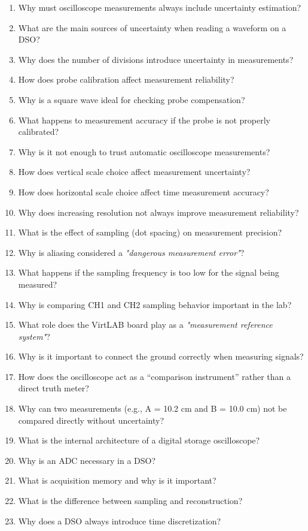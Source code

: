 \documentclass[../main.tex]{subfiles}
\begin{document}
\begin{enumerate}[label=\textbf{\arabic*.}]
	\item Why must oscilloscope measurements always include uncertainty estimation?
	\item What are the main sources of uncertainty when reading a waveform on a DSO?
	\item Why does the number of divisions introduce uncertainty in measurements?
	\item How does probe calibration affect measurement reliability?
	\item Why is a square wave ideal for checking probe compensation?
	\item What happens to measurement accuracy if the probe is not properly calibrated?
	\item Why is it not enough to trust automatic oscilloscope measurements?
	\item How does vertical scale choice affect measurement uncertainty?
	\item How does horizontal scale choice affect time measurement accuracy?
	\item Why does increasing resolution not always improve measurement reliability?
	\item What is the effect of sampling (dot spacing) on measurement precision?
	\item Why is aliasing considered a \textit{"dangerous measurement error"}?
	\item What happens if the sampling frequency is too low for the signal being measured?
	\item Why is comparing CH1 and CH2 sampling behavior important in the lab?
	\item What role does the VirtLAB board play as a \textit{"measurement reference system"}?
	\item Why is it important to connect the ground correctly when measuring signals?
	\item How does the oscilloscope act as a “comparison instrument” rather than a direct truth meter?
	\item Why can two measurements (e.g., A = 10.2 cm and B = 10.0 cm) not be compared directly without uncertainty?
	\item What is the internal architecture of a digital storage oscilloscope?
	\item Why is an ADC necessary in a DSO?
	\item What is acquisition memory and why is it important?
	\item What is the difference between sampling and reconstruction?
	\item Why does a DSO always introduce time discretization?

\end{enumerate}
\end{document}
